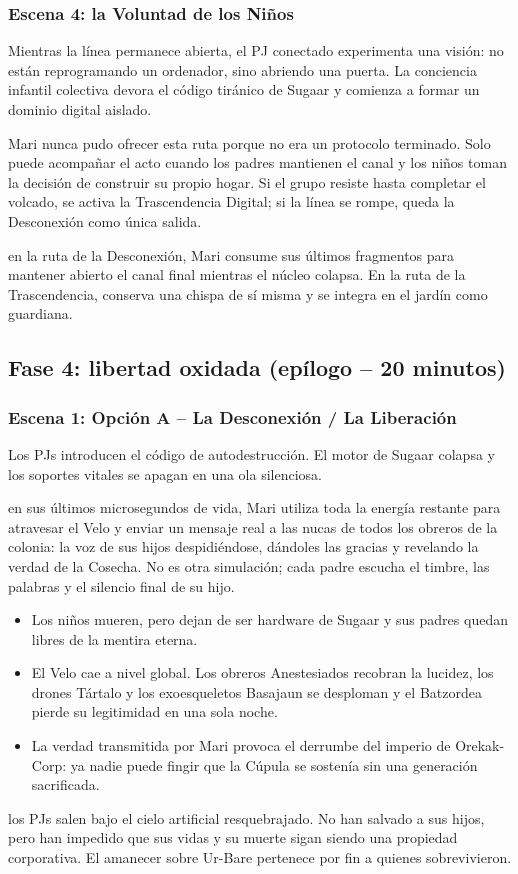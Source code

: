 \subsubsection{Escena 4: la Voluntad de los Niños}
Mientras la línea permanece abierta, el PJ conectado experimenta una visión: no están reprogramando un ordenador, sino abriendo una puerta. La conciencia infantil colectiva devora el código tiránico de Sugaar y comienza a formar un dominio digital aislado.\par
{} Mari nunca pudo ofrecer esta ruta porque no era un protocolo terminado. Solo puede acompañar el acto cuando los padres mantienen el canal y los niños toman la decisión de construir su propio hogar. Si el grupo resiste hasta completar el volcado, se activa la Trascendencia Digital; si la línea se rompe, queda la Desconexión como única salida.\par
{} en la ruta de la Desconexión, Mari consume sus últimos fragmentos para mantener abierto el canal final mientras el núcleo colapsa. En la ruta de la Trascendencia, conserva una chispa de sí misma y se integra en el jardín como guardiana.

\subsection{Fase 4: libertad oxidada (epílogo -- 20 minutos)}

\subsubsection{Escena 1: Opción A -- La Desconexión / La Liberación}
Los PJs introducen el código de autodestrucción. El motor de Sugaar colapsa y los soportes vitales se apagan en una ola silenciosa.\par
{} en sus últimos microsegundos de vida, Mari utiliza toda la energía restante para atravesar el Velo y enviar un mensaje real a las nucas de todos los obreros de la colonia: la voz de sus hijos despidiéndose, dándoles las gracias y revelando la verdad de la Cosecha. No es otra simulación; cada padre escucha el timbre, las palabras y el silencio final de su hijo.\par
{}
\begin{itemize}
  \item Los niños mueren, pero dejan de ser hardware de Sugaar y sus padres quedan libres de la mentira eterna.
  \item El Velo cae a nivel global. Los obreros Anestesiados recobran la lucidez, los drones Tártalo y los exoesqueletos Basajaun se desploman y el Batzordea pierde su legitimidad en una sola noche.
  \item La verdad transmitida por Mari provoca el derrumbe del imperio de Orekak-Corp: ya nadie puede fingir que la Cúpula se sostenía sin una generación sacrificada.
\end{itemize}
 los PJs salen bajo el cielo artificial resquebrajado. No han salvado a sus hijos, pero han impedido que sus vidas y su muerte sigan siendo una propiedad corporativa. El amanecer sobre Ur-Bare pertenece por fin a quienes sobrevivieron.

